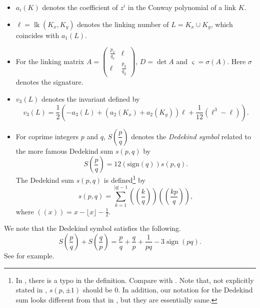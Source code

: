 \documentclass{amsart}
\theoremstyle{remark}
\newcommand{\sign}{\mathop{\mathrm{sign}}\nolimits}
\newcommand{\lk}{\mathop{\mathrm{lk}}\nolimits}
\begin{document}
\begin{itemize}
\item $a_{i}(K)$ denotes the coefficient of $z^{i}$ in the Conway polynomial of a link $K$. 
\item $\ell = \lk(K_x,K_y)$ denotes the linking number of $L = K_x \cup K_y$, which coincides with $a_1(L)$. 
\item For the linking matrix $A=\begin{pmatrix} \frac{p_x}{q_x} & \ell \\ \ell & \frac{p_y}{q_y} \end{pmatrix}$, $D= \det A$ and $\varsigma =\sigma(A)$. Here $\sigma$ denotes the signature.
\item $v_3(L)$ denotes %
the invariant defined by 
\[ v_3(L)=\frac{1}{2}\left( -a_3(L)+(a_2(K_x)+a_2(K_y))\ell +\frac{1}{12}(\ell^3-\ell) \right) . \]
\item For coprime integers $p$ and $q$, $S\left(\dfrac{p}{q}\right)$ denotes the \emph{Dedekind symbol} related to the more famous Dedekind sum $s(p,q)$ by 
\[ S\left(\frac{p}{q}\right)=  12(\mathrm{sign}(q))s(p,q). \]
The Dedekind sum $s(p,q)$ is defined\footnote{In \cite[Theorem 1.5]{Ito2022}, there is a typo in the definition. Compare with \cite[Definition 1.5]{BarNatanLawrence}\label{ft}. Note that, not explicitly stated in \cite[Definition 1.5]{BarNatanLawrence}, $s(p,\pm 1)$ should be $0$. In addition, our notation for the Dedekind sum looks different from that in \cite{BoyerLines}, but they are essentially same. 
} by
\[ s(p,q)=\sum_{k=1}^{|q|-1} \left(\!\!\left( \frac{k}{q}\right)\!\!\right)\left(\!\!\left( \frac{kp}{q}\right)\!\!\right), 
\]
where $(\!( x)\!)=x-\lfloor x\rfloor -\frac{1}{2}$.
\end{itemize}

We note that the Dedekind symbol satisfies the following.
\begin{equation}\label{eq:DedekindSymbol}
    S\left(\frac{p}{q}\right) + S\left(\frac{q}{p}\right) = 
\frac{p}{q} + \frac{q}{p} + \frac{1}{pq} - 3 \sign (p q).
\end{equation}
See \cite[Definition 1.5]{BarNatanLawrence} for example. 
\end{document}
